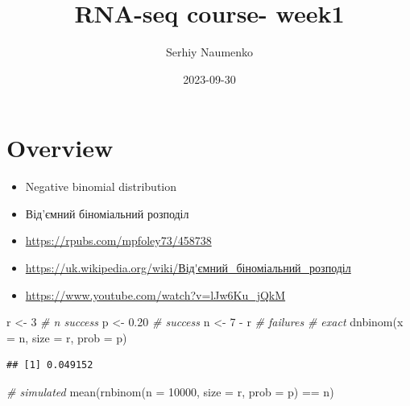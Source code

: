 \documentclass[
  10pt,
]{article}
\title{RNA-seq course- week1}
\author{Serhiy Naumenko}
\date{2023-09-30}
\newenvironment{Shaded}{\begin{snugshade}}{\end{snugshade}}
\newcommand{\AttributeTok}[1]{\textcolor[rgb]{0.77,0.63,0.00}{#1}}
\newcommand{\CommentTok}[1]{\textcolor[rgb]{0.56,0.35,0.01}{\textit{#1}}}
\newcommand{\DecValTok}[1]{\textcolor[rgb]{0.00,0.00,0.81}{#1}}
\newcommand{\FloatTok}[1]{\textcolor[rgb]{0.00,0.00,0.81}{#1}}
\newcommand{\FunctionTok}[1]{\textcolor[rgb]{0.00,0.00,0.00}{#1}}
\newcommand{\NormalTok}[1]{#1}
\newcommand{\OtherTok}[1]{\textcolor[rgb]{0.56,0.35,0.01}{#1}}
\newcommand{\SpecialCharTok}[1]{\textcolor[rgb]{0.00,0.00,0.00}{#1}}
\providecommand{\tightlist}{%
  \setlength{\itemsep}{0pt}\setlength{\parskip}{0pt}}
\begin{document}
\maketitle

{
\hypersetup{linkcolor=}
\setcounter{tocdepth}{2}
\tableofcontents
}
\hypertarget{overview}{%
\section{Overview}\label{overview}}

\begin{itemize}
\tightlist
\item
  Negative binomial distribution
\item
  Від'ємний біноміальний розподіл
\item
  \url{https://rpubs.com/mpfoley73/458738}
\item
  \url{https://uk.wikipedia.org/wiki/Від'ємний_біноміальний_розподіл}
\item
  \url{https://www.youtube.com/watch?v=lJw6Ku_jQkM}
\end{itemize}

\newpage

\begin{Shaded}
\begin{Highlighting}[]
\NormalTok{r }\OtherTok{\textless{}{-}}  \DecValTok{3} \CommentTok{\# n success}
\NormalTok{p }\OtherTok{\textless{}{-}}  \FloatTok{0.20} \CommentTok{\# success}
\NormalTok{n }\OtherTok{\textless{}{-}}  \DecValTok{7} \SpecialCharTok{{-}}\NormalTok{ r }\CommentTok{\# failures}
\CommentTok{\# exact}
\FunctionTok{dnbinom}\NormalTok{(}\AttributeTok{x =}\NormalTok{ n, }\AttributeTok{size =}\NormalTok{ r, }\AttributeTok{prob =}\NormalTok{ p)}
\end{Highlighting}
\end{Shaded}

\begin{verbatim}
## [1] 0.049152
\end{verbatim}

\begin{Shaded}
\begin{Highlighting}[]
\CommentTok{\# simulated}
\FunctionTok{mean}\NormalTok{(}\FunctionTok{rnbinom}\NormalTok{(}\AttributeTok{n =} \DecValTok{10000}\NormalTok{, }\AttributeTok{size =}\NormalTok{ r, }\AttributeTok{prob =}\NormalTok{ p) }\SpecialCharTok{==}\NormalTok{ n)}
\end{Highlighting}
\end{Shaded}
\end{document}
